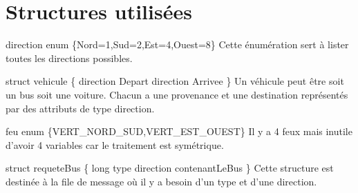 \section{Structures utilisées}
direction enum \{Nord=1,Sud=2,Est=4,Ouest=8\}
Cette énumération sert à lister toutes les directions possibles.

struct vehicule \{
  direction Depart
  direction Arrivee
\}
Un véhicule peut être soit un bus soit une voiture. Chacun a une provenance et une destination représentés par des attributs de type direction.

feu enum \{VERT\_NORD\_SUD,VERT\_EST\_OUEST\}
Il y a 4 feux mais inutile d'avoir 4 variables car le traitement est symétrique.

struct requeteBus \{
  long type
  direction contenantLeBus
\}
Cette structure est destinée à la file de message où il y a besoin d'un type et d'une direction.

